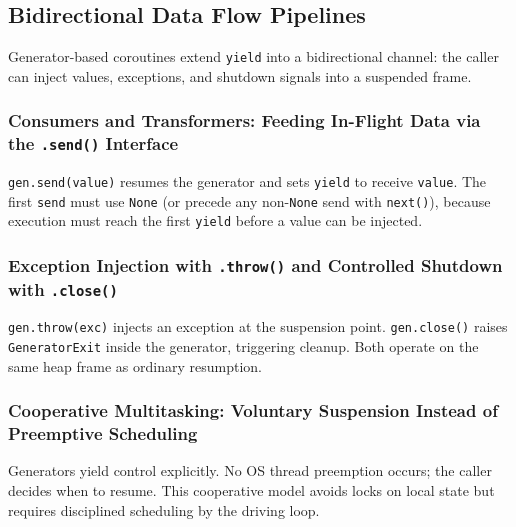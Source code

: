 \subsection{Bidirectional Data Flow Pipelines}

Generator-based coroutines extend \texttt{yield} into a bidirectional channel: the caller can inject values, exceptions, and shutdown signals into a suspended frame.

\subsubsection{Consumers and Transformers: Feeding In-Flight Data via the \texttt{.send()} Interface}

\texttt{gen.send(value)} resumes the generator and sets \texttt{yield} to receive \texttt{value}. The first \texttt{send} must use \texttt{None} (or precede any non-\texttt{None} send with \texttt{next()}), because execution must reach the first \texttt{yield} before a value can be injected.



\subsubsection{Exception Injection with \texttt{.throw()} and Controlled Shutdown with \texttt{.close()}}

\texttt{gen.throw(exc)} injects an exception at the suspension point. \texttt{gen.close()} raises \texttt{GeneratorExit} inside the generator, triggering cleanup. Both operate on the same heap frame as ordinary resumption.

\subsubsection{Cooperative Multitasking: Voluntary Suspension Instead of Preemptive Scheduling}

Generators yield control explicitly. No OS thread preemption occurs; the caller decides when to resume. This cooperative model avoids locks on local state but requires disciplined scheduling by the driving loop.
